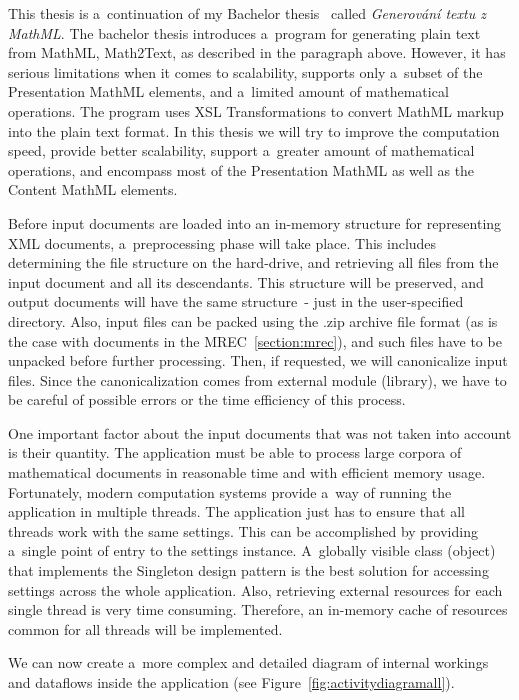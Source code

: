 \documentclass[11pt,oneside,final]{fithesis2}
\def\s#1{#1\index{#1}}
\begin{document}
This thesis is a~continuation of my Bachelor thesis~\cite{Kucbel2011thesis} called \textit{Generování textu z MathML}. The bachelor thesis introduces a~program for generating plain text from MathML, \s{Math2Text}, as described in the paragraph above. However, it has serious limitations when it comes to scalability, supports only a~subset of the Presentation MathML elements, and a~limited amount of mathematical operations. The program uses XSL Transformations to convert MathML markup into the plain text format. In this thesis we will try to improve the computation speed, provide better scalability, support a~greater amount of mathematical operations, and encompass most of the Presentation MathML as well as the Content MathML elements.

Before input documents are loaded into an in-memory structure for representing XML documents, a~preprocessing phase will take place. This includes determining the file structure on the hard-drive, and retrieving all files from the input document and all its descendants. This structure will be preserved, and output documents will have the same structure~- just in the user-specified directory. Also, input files can be packed using the .zip archive file format (as is the case with documents in the MREC~\ref{section:mrec}), and such files have to be unpacked before further processing. Then, if requested, we will canonicalize input files. Since the canonicalization comes from external module (library), we have to be careful of possible errors or the time efficiency of this process. 

One important factor about the input documents that was not taken into account is their quantity. The application must be able to process large corpora of mathematical documents in reasonable time and with efficient memory usage. Fortunately, modern computation systems provide a~way of running the application in multiple threads. The application just has to ensure that all threads work with the same settings. This can be accomplished by providing a~single point of entry to the settings instance. A~globally visible class (object) that implements the \s{Singleton} design pattern is the best solution for accessing settings across the whole application. Also, retrieving external resources for each single thread is very time consuming. Therefore, an in-memory cache of resources common for all threads will be implemented.

We can now create a~more complex and detailed diagram of internal workings and dataflows inside the application (see Figure~\ref{fig:activitydiagramall}). 
\end{document}
